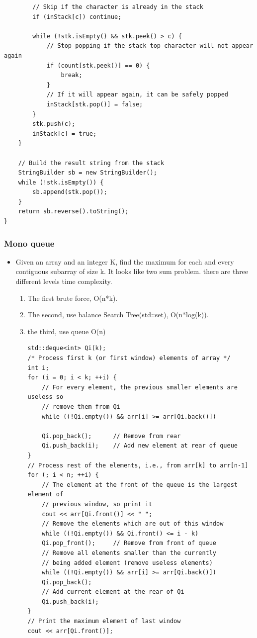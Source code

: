 \documentclass[a4paper,11pt,twoside]{book}
\begin{document}
\begin{itemize}
\begin{lstlisting}
		// Skip if the character is already in the stack
		if (inStack[c]) continue;
		
		while (!stk.isEmpty() && stk.peek() > c) {
			// Stop popping if the stack top character will not appear again
			if (count[stk.peek()] == 0) {
				break;
			}
			// If it will appear again, it can be safely popped
			inStack[stk.pop()] = false;
		}
		stk.push(c);
		inStack[c] = true;
	}
	
	// Build the result string from the stack
	StringBuilder sb = new StringBuilder();
	while (!stk.isEmpty()) {
		sb.append(stk.pop());
	}
	return sb.reverse().toString();
}
\end{lstlisting}	
	
\end{itemize}	

\subsubsection{Mono queue}
\begin{itemize}
	\item Given an array and an integer K, find the maximum for each and every contiguous subarray of size k. It looks like two sum problem. there are three different levels time complexity. 
\begin{enumerate}
	\item The first brute force, O(n*k). 
	\item The second, use balance Search Tree(std::set), O(n*log(k)). 
	\item the third, use queue O(n)
\begin{lstlisting}[breaklines]
std::deque<int> Qi(k);
/* Process first k (or first window) elements of array */
int i;
for (i = 0; i < k; ++i) {
	// For every element, the previous smaller elements are useless so
	// remove them from Qi
	while ((!Qi.empty()) && arr[i] >= arr[Qi.back()])
	
	Qi.pop_back();  	// Remove from rear	
	Qi.push_back(i);    // Add new element at rear of queue
}
// Process rest of the elements, i.e., from arr[k] to arr[n-1]
for (; i < n; ++i) {
	// The element at the front of the queue is the largest element of
	// previous window, so print it
	cout << arr[Qi.front()] << " ";	
	// Remove the elements which are out of this window
	while ((!Qi.empty()) && Qi.front() <= i - k)
	Qi.pop_front();  	// Remove from front of queue	
	// Remove all elements smaller than the currently
	// being added element (remove useless elements)
	while ((!Qi.empty()) && arr[i] >= arr[Qi.back()])
	Qi.pop_back();	
	// Add current element at the rear of Qi
	Qi.push_back(i);
}
// Print the maximum element of last window
cout << arr[Qi.front()];	    
\end{lstlisting}	
	

\end{enumerate}

	
\end{itemize}
\end{document}
